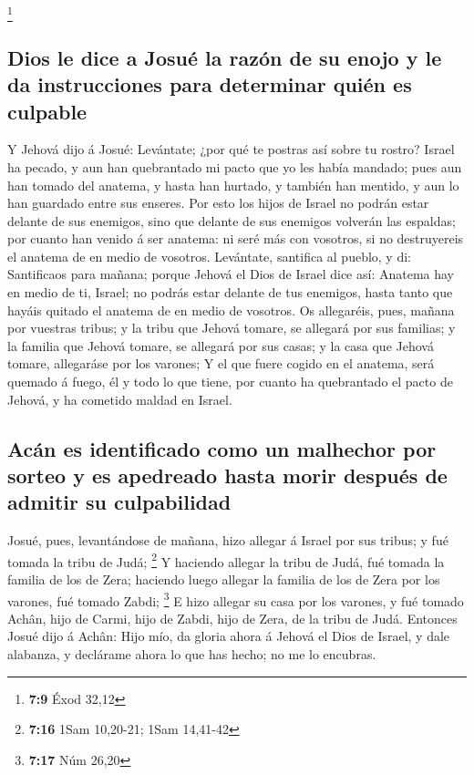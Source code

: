 \footnote{\textbf{7:9} Éxod 32,12}

\hypertarget{dios-le-dice-a-josuuxe9-la-razuxf3n-de-su-enojo-y-le-da-instrucciones-para-determinar-quiuxe9n-es-culpable}{%
\subsection{Dios le dice a Josué la razón de su enojo y le da
instrucciones para determinar quién es
culpable}\label{dios-le-dice-a-josuuxe9-la-razuxf3n-de-su-enojo-y-le-da-instrucciones-para-determinar-quiuxe9n-es-culpable}}

 Y Jehová dijo á Josué: Levántate; ¿por qué te postras así
sobre tu rostro?  Israel ha pecado, y aun han quebrantado
mi pacto que yo les había mandado; pues aun han tomado del anatema, y
hasta han hurtado, y también han mentido, y aun lo han guardado entre
sus enseres.  Por esto los hijos de Israel no podrán estar
delante de sus enemigos, sino que delante de sus enemigos volverán las
espaldas; por cuanto han venido á ser anatema: ni seré más con vosotros,
si no destruyereis el anatema de en medio de vosotros. 
Levántate, santifica al pueblo, y di: Santificaos para mañana; porque
Jehová el Dios de Israel dice así: Anatema hay en medio de ti, Israel;
no podrás estar delante de tus enemigos, hasta tanto que hayáis quitado
el anatema de en medio de vosotros.  Os allegaréis, pues,
mañana por vuestras tribus; y la tribu que Jehová tomare, se allegará
por sus familias; y la familia que Jehová tomare, se allegará por sus
casas; y la casa que Jehová tomare, allegaráse por los varones;
 Y el que fuere cogido en el anatema, será quemado á fuego,
él y todo lo que tiene, por cuanto ha quebrantado el pacto de Jehová, y
ha cometido maldad en Israel.

\hypertarget{acuxe1n-es-identificado-como-un-malhechor-por-sorteo-y-es-apedreado-hasta-morir-despuuxe9s-de-admitir-su-culpabilidad}{%
\subsection{Acán es identificado como un malhechor por sorteo y es
apedreado hasta morir después de admitir su
culpabilidad}\label{acuxe1n-es-identificado-como-un-malhechor-por-sorteo-y-es-apedreado-hasta-morir-despuuxe9s-de-admitir-su-culpabilidad}}

 Josué, pues, levantándose de mañana, hizo allegar á Israel
por sus tribus; y fué tomada la tribu de Judá; \footnote{\textbf{7:16}
  1Sam 10,20-21; 1Sam 14,41-42}  Y haciendo allegar la
tribu de Judá, fué tomada la familia de los de Zera; haciendo luego
allegar la familia de los de Zera por los varones, fué tomado Zabdi;
\footnote{\textbf{7:17} Núm 26,20}  E hizo allegar su casa
por los varones, y fué tomado Achân, hijo de Carmi, hijo de Zabdi, hijo
de Zera, de la tribu de Judá.  Entonces Josué dijo á Achân:
Hijo mío, da gloria ahora á Jehová el Dios de Israel, y dale alabanza, y
declárame ahora lo que has hecho; no me lo encubras.

